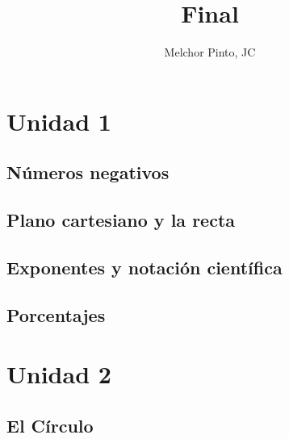 \documentclass[examen]{RDS_unit}
\title{Final}
\author{Melchor Pinto, JC}
\begin{document}
    \begin{questions}
    \section{Unidad 1}

    

\subsection{Números negativos}


% 


\newpage
\subsection{Plano cartesiano y la recta}
	

%
% 
%
\newpage
\subsection{Exponentes y notación científica}




    \newpage

    \subsection{Porcentajes}

% 


\newpage
    \section{Unidad 2}

    \subsection{El Círculo}
	   

\end{questions}
\end{document}
